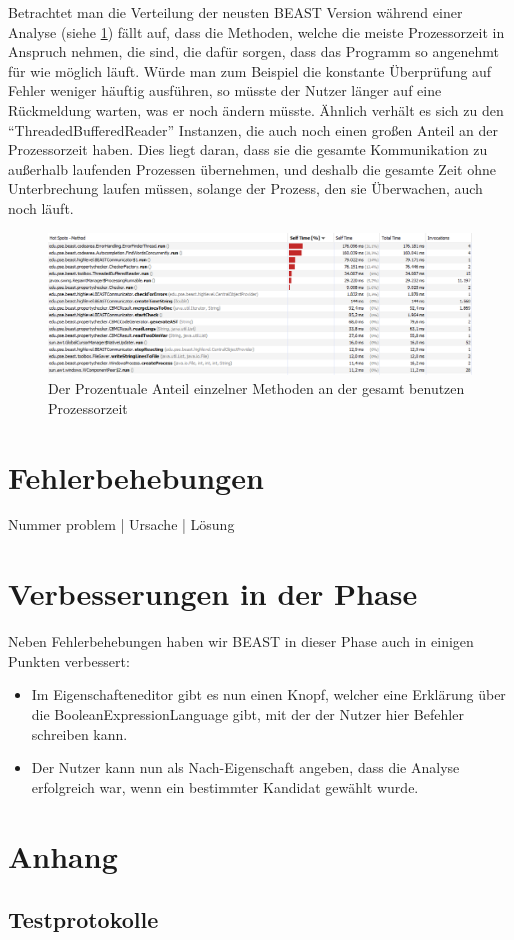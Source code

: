 \documentclass[a4paper]{scrreprt}
\begin{document}
\newpage
Betrachtet man die Verteilung der neusten BEAST Version während einer
Analyse (siehe \ref{fig5}) fällt auf, dass die Methoden, welche die meiste
Prozessorzeit in Anspruch nehmen, die sind, die dafür sorgen, dass das Programm
so angenehmt für wie möglich läuft. Würde man zum Beispiel die konstante
Überprüfung auf Fehler weniger häuftig ausführen, so müsste der Nutzer länger auf eine
Rückmeldung warten, was er noch ändern müsste. Ähnlich verhält es sich zu den
"`ThreadedBufferedReader"' Instanzen, die auch noch einen großen Anteil an der
Prozessorzeit haben. Dies liegt daran, dass sie die gesamte Kommunikation zu
außerhalb laufenden Prozessen übernehmen, und deshalb die gesamte Zeit ohne
Unterbrechung laufen müssen, solange der Prozess, den sie Überwachen, auch noch
läuft.

\begin{figure}[ht]
	\centering
  \includegraphics[width=1.0\textwidth,
  height=0.40\textwidth]{images/BEAST_PROCESSORTIME.png} \caption{Der
  Prozentuale Anteil einzelner Methoden an der gesamt benutzen Prozessorzeit}
	\label{fig5}
\end{figure}

\chapter{Fehlerbehebungen}

Nummer problem | Ursache | Lösung


\chapter{Verbesserungen in der Phase}
Neben Fehlerbehebungen haben wir BEAST in dieser Phase auch in einigen Punkten
verbessert:

\begin{itemize}
  \item Im Eigenschafteneditor gibt es nun einen Knopf, welcher eine Erklärung
  über die BooleanExpressionLanguage gibt, mit der der Nutzer hier Befehler
  schreiben kann.
  \item Der Nutzer kann nun als Nach-Eigenschaft angeben, dass die Analyse
  erfolgreich war, wenn ein bestimmter Kandidat gewählt wurde.
\end{itemize}

\chapter{Anhang}

\section{Testprotokolle}


\end{document}
